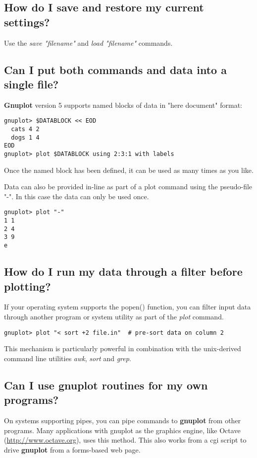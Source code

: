 \documentclass[a4paper,11pt]{article}
\def\http#1{{\small\href{http://#1}{\url{http://#1}}}}
\newcommand{\http}[1]%
            {\htmladdnormallink{\latex{\url{http://#1}}%
                    \html{\textit{http://#1}}}%
                {http://#1}%
            }
\newcommand{\gnuplot}{\textbf{gnuplot }}
\newcommand{\Gnuplot}{\textbf{Gnuplot }}
\begin{document}
\subsection{How do I save and restore my current settings?}

Use the {\em save "filename"} and {\em load "filename"} commands.

\subsection{Can I put both commands and data into a single file?}

\Gnuplot version 5 supports named blocks of data in "here document" format:
\small
\begin{verbatim}
gnuplot> $DATABLOCK << EOD
  cats 4 2
  dogs 1 4
EOD
gnuplot> plot $DATABLOCK using 2:3:1 with labels
\end{verbatim}
\normalsize
Once the named block has been defined, it can be used as many times
as you like.

Data can also be provided in-line as part of a plot command using the
pseudo-file "-".  In this case the data can only be used once.

\small
\begin{verbatim}
gnuplot> plot "-"
1 1
2 4
3 9
e
\end{verbatim}
\normalsize

\subsection{How do I run my data through a filter before plotting?}

If your operating system supports the popen() function, you
can filter input data through another program or system utility
as part of the {\em plot} command.

\small
\begin{verbatim}
gnuplot> plot "< sort +2 file.in"  # pre-sort data on column 2
\end{verbatim}
\normalsize

This mechanism is particularly powerful in combination with the
unix-derived command line utilities {\em awk}, {\em sort} and {\em grep}.

\subsection{Can I use \gnuplot routines for my own programs?}

On systems supporting pipes, you can pipe commands to \gnuplot from other
programs. Many applications with gnuplot as the graphics engine, like Octave
(\http{www.octave.org}), uses this method. This also works from a cgi script to
drive \gnuplot from a forms-based web page.
\end{document}
